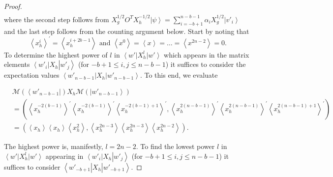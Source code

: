 \documentclass{theoretics}
\begin{document}
\begin{proof}
\begin{align}
  \end{align}
  where the second step follows from $X_{g}^{1/2}O^{T}X_{h}^{-1/2}\left|\psi\right\rangle =\sum_{i=-b+1}^{n-b-1}\alpha_{i}X_{g}^{1/2}\left|v'_{i}\right\rangle $
  and the last step follows from the counting argument below. Start by noting that
  \begin{equation}
    \left\langle x_{h}^{i}\right\rangle ^{\prime}=\left\langle x_{h}^{i+2b-1}\right\rangle  \text{ and  }
    \left\langle x^{0}\right\rangle =\left\langle x\right\rangle =\dots=\left\langle x^{2n-2}\right\rangle =0.\label{eq:monomialmisalignedMochonPowers}
  \end{equation}
  To determine the highest power of $l$ in $\left\langle w'\right|X_{h}^{l}\left|w'\right\rangle $
  which appears in the matrix elements $\left\langle w'_{i}\right|X_{h}\left|w'_{j}\right\rangle $
  (for $-b+1\le i,j\le n-b-1$) it suffices to consider the expectation values $\left\langle w'_{n-b-1}\right|X_{h}\left|w'_{n-b-1}\right\rangle $.
  To this end, we evaluate
  \begin{small}
    \begin{align*}
       & \mathcal{M}(\left\langle w'_{n-b-1}\right|)X_{h}\mathcal{M}(\left|w'_{n-b-1}\right\rangle )                                                                                                                                                                                                                                              \\
       & =\left(\left\langle x_{h}^{-2(b-1)}\right\rangle ^{\prime}\left\langle x_{h}^{-2(b-1)}\right\rangle ^{\prime}\left\langle x_{h}^{-2(b-1)+1}\right\rangle ^{\prime},\left\langle x_{h}^{2(n-b-1)}\right\rangle ^{\prime}\left\langle x_{h}^{2(n-b-1)}\right\rangle ^{\prime}\left\langle x_{h}^{2(n-b-1)+1}\right\rangle ^{\prime}\right) \\
       & =\left(\left\langle x_{h}\right\rangle \left\langle x_{h}\right\rangle \left\langle x_{h}^{2}\right\rangle ,\left\langle x_{h}^{2n-3}\right\rangle \left\langle x_{h}^{2n-3}\right\rangle \left\langle x_{h}^{2n-2}\right\rangle \right).
    \end{align*}
  \end{small}	The highest power is, manifestly, $l=2n-2$. To find the lowest power
  $l$ in $\left\langle w'\right|X_{h}^{l}\left|w'\right\rangle $
  appearing in  $\left\langle w'_{i}\right|X_{h}\left|w'_{j}\right\rangle $
  (for $-b+1\le i,j\le n-b-1$) it suffices to consider $\left\langle w'_{-b+1}\right|X_{h}\left|w'_{-b+1}\right\rangle $.

\end{proof}
\end{document}

